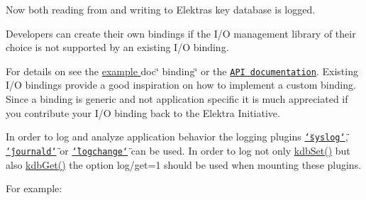 Now both reading from and writing to Elektra\textquotesingle{}s key database is logged.

Developers can create their own bindings if the I/O management library of their choice is not supported by an existing I/O binding.

For details on see the \hyperlink{md_src_bindings_io_doc_README_src_bindings_io_doc_README_md}{example }doc\char`\"{} binding\char`\"{} or the \href{https://doc.libelektra.org/api/latest/html/group__kdbio.html}{\tt A\+PI documentation}. Existing I/O bindings provide a good inspiration on how to implement a custom binding. Since a binding is generic and not application specific it is much appreciated if you contribute your I/O binding back to the Elektra Initiative.

In order to log and analyze application behavior the logging plugins \href{https://www.libelektra.org/plugins/syslog}{\tt \char`\"{}syslog\char`\"{}}, \href{https://www.libelektra.org/plugins/journald}{\tt \char`\"{}journald\char`\"{}} or \href{https://www.libelektra.org/plugins/logchange}{\tt \char`\"{}logchange\char`\"{}} can be used. In order to log not only {\ttfamily \hyperlink{group__kdb_ga11436b058408f83d303ca5e996832bcf}{kdb\+Set()}} but also {\ttfamily \hyperlink{group__kdb_ga28e385fd9cb7ccfe0b2f1ed2f62453a1}{kdb\+Get()}} the option {\ttfamily log/get=1} should be used when mounting these plugins.

For example\+:


 